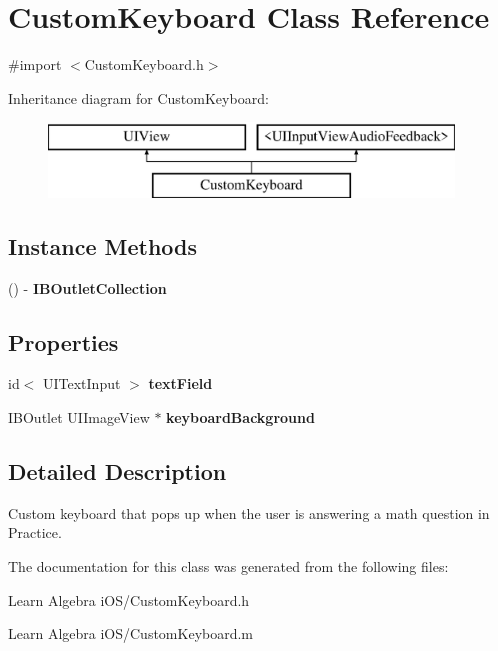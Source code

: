 \hypertarget{interface_custom_keyboard}{\section{Custom\-Keyboard Class Reference}
\label{interface_custom_keyboard}
}


{\ttfamily \#import $<$Custom\-Keyboard.\-h$>$}

Inheritance diagram for Custom\-Keyboard\-:\begin{figure}[H]
\begin{center}
\leavevmode
\includegraphics[height=2.000000cm]{interface_custom_keyboard}
\end{center}
\end{figure}
\subsection*{Instance Methods}
\begin{DoxyCompactItemize}
\item 
\hypertarget{interface_custom_keyboard_a331f37bcdc38c80600324e5ba97696cb}{() -\/ {\bfseries I\-B\-Outlet\-Collection}}\label{interface_custom_keyboard_a331f37bcdc38c80600324e5ba97696cb}

\end{DoxyCompactItemize}
\subsection*{Properties}
\begin{DoxyCompactItemize}
\item 
\hypertarget{interface_custom_keyboard_a9fea190b23fcf06cc9ab3a852bd0f9f9}{id$<$ U\-I\-Text\-Input $>$ {\bfseries text\-Field}}\label{interface_custom_keyboard_a9fea190b23fcf06cc9ab3a852bd0f9f9}

\item 
\hypertarget{interface_custom_keyboard_a56952638f421e862e20374c2b836d2c7}{I\-B\-Outlet U\-I\-Image\-View $\ast$ {\bfseries keyboard\-Background}}\label{interface_custom_keyboard_a56952638f421e862e20374c2b836d2c7}

\end{DoxyCompactItemize}


\subsection{Detailed Description}
Custom keyboard that pops up when the user is answering a math question in Practice. 

The documentation for this class was generated from the following files\-:\begin{DoxyCompactItemize}
\item 
Learn Algebra i\-O\-S/Custom\-Keyboard.\-h\item 
Learn Algebra i\-O\-S/Custom\-Keyboard.\-m\end{DoxyCompactItemize}
